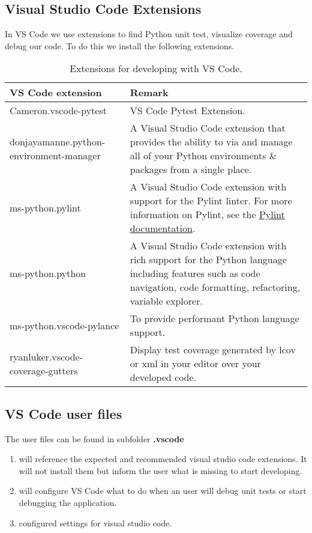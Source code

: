 \subsection{Visual Studio Code Extensions}
In VS Code we use extensions to find Python unit test, visualize coverage and debug our code.
To do this we install the following extensions.

\begin{longtable}{|p{4cm}|p{10cm}|}
	\caption{Extensions for developing with VS Code.} \\
	\hline
	\textbf{VS Code extension} & \textbf{Remark} \\ \hline
	\endfirsthead
	Cameron.vscode-pytest & VS Code Pytest Extension. \\ \hline
	donjayamanne.python-environment-manager & A Visual Studio Code extension that provides the ability to via and manage all of your Python environments \& packages from a single place. \\ \hline
	ms-python.pylint & A Visual Studio Code extension with support for the Pylint linter.
	For more information on Pylint, see the \href{https://pylint.readthedocs.io/}{Pylint documentation}. \\ \hline
	ms-python.python & A Visual Studio Code extension with rich support for the Python language including features such as code navigation, code formatting, refactoring, variable explorer. \\ \hline
	ms-python.vscode-pylance & To provide performant Python language support. \\ \hline
	ryanluker.vscode-coverage-gutters & Display test coverage generated by lcov or xml in your editor over your developed code. \\ \hline
\end{longtable}


\subsection{VS Code user files}
The user files can be found in subfolder \textbf{.vscode}

\begin{enumerate}
	\item {} will reference the expected and recommended visual studio code extensions. It will not install them but inform the user what is missing to start developing.
	\item {} will configure VS Code what to do when an user will debug unit tests or start debugging the application.
	\item {} configured settings for visual studio code.
\end{enumerate}


